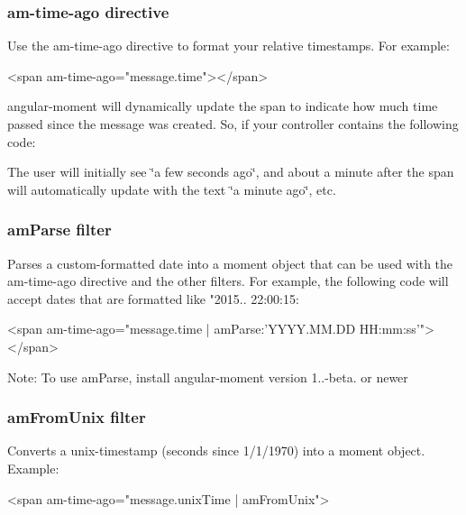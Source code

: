 \subsubsection*{am-\/time-\/ago directive}

Use the {\ttfamily am-\/time-\/ago} directive to format your relative timestamps. For example\+:


\begin{DoxyCode}
<span am-time-ago="message.time"></span>
\end{DoxyCode}


angular-\/moment will dynamically update the span to indicate how much time passed since the message was created. So, if your controller contains the following code\+: 


The user will initially see \char`\"{}a few seconds ago\char`\"{}, and about a minute after the span will automatically update with the text \char`\"{}a minute ago\char`\"{}, etc.

\subsubsection*{am\+Parse filter}

Parses a custom-\/formatted date into a moment object that can be used with the {\ttfamily am-\/time-\/ago} directive and the other filters. For example, the following code will accept dates that are formatted like "2015.. 22\+:00\+:15\textquotesingle{}\+:


\begin{DoxyCode}
<span am-time-ago="message.time | amParse:'YYYY.MM.DD HH:mm:ss'"></span>
\end{DoxyCode}


Note\+: To use {\ttfamily am\+Parse}, install angular-\/moment version 1..-\/beta. or newer

\subsubsection*{am\+From\+Unix filter}

Converts a unix-\/timestamp (seconds since 1/1/1970) into a moment object. Example\+:


\begin{DoxyCode}
<span am-time-ago="message.unixTime | amFromUnix">
\end{DoxyCode}



